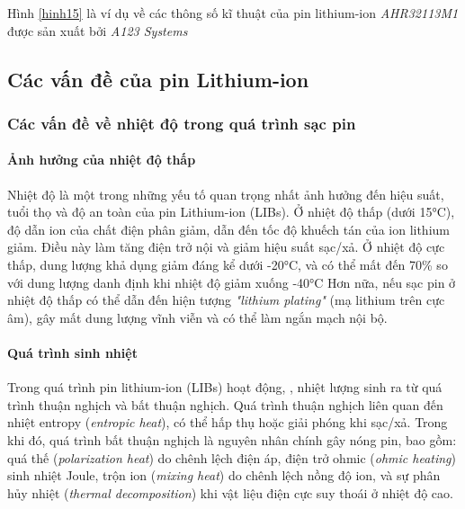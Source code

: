 \documentclass{thesis}
\begin{document}
Hình \ref{hinh15} là ví dụ về các thông số kĩ thuật của pin lithium-ion \textit{AHR32113M1} được sản xuất bởi \textit{A123 Systems}
\newpage

\subsection{Các vấn đề của pin Lithium-ion}


\subsubsection{Các vấn đề về nhiệt độ trong quá trình sạc pin}
\paragraph{Ảnh hưởng của nhiệt độ thấp}\mbox{}

Nhiệt độ là một trong những yếu tố quan trọng nhất ảnh hưởng đến hiệu suất, tuổi thọ và độ an toàn của pin Lithium-ion (LIBs). Ở nhiệt độ thấp (dưới 15°C), độ dẫn ion của chất điện phân giảm, dẫn đến tốc độ khuếch tán của ion lithium giảm. Điều này làm tăng điện trở nội và giảm hiệu suất sạc/xả. 
Ở nhiệt độ cực thấp, dung lượng khả dụng giảm đáng kể dưới -20°C, và có thể mất đến 70\% so với dung lượng danh định khi nhiệt độ giảm xuống -40°C \cite{bandhauer2011critical}
Hơn nữa, nếu sạc pin ở nhiệt độ thấp có thể dẫn đến hiện tượng \textit{"lithium plating"} (mạ lithium trên cực âm), gây mất dung lượng vĩnh viễn và có thể làm ngắn mạch nội bộ.


\paragraph{Quá trình sinh nhiệt}\mbox{}


Trong quá trình pin lithium-ion (LIBs) hoạt động, , nhiệt lượng sinh ra từ quá trình thuận nghịch và bất thuận nghịch. Quá trình thuận nghịch liên quan đến nhiệt entropy (\textit{entropic heat}), có thể hấp thụ hoặc giải phóng khi sạc/xả. Trong khi đó, quá trình bất thuận nghịch là nguyên nhân chính gây nóng pin, bao gồm: quá thế (\textit{polarization heat}) do chênh lệch điện áp, điện trở ohmic (\textit{ohmic heating}) sinh nhiệt Joule, trộn ion (\textit{mixing heat}) do chênh lệch nồng độ ion, và sự phân hủy nhiệt (\textit{thermal decomposition}) khi vật liệu điện cực suy thoái ở nhiệt độ cao.
\end{document}
